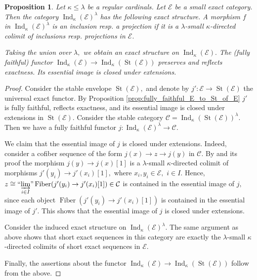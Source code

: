 \documentclass[11pt,leqno]{amsart}
\newtheorem{prop}[theo]{Proposition}
\numberwithin{equation}{section}
\newcommand{\indlim}[1][]{\mathop{\varinjlim}\limits_{#1}}
\newcommand{\inddlim}[1][]{{``{\indlim[#1]}"}}
\newcommand{\Fiber}{\operatorname{Fiber}}
\newcommand{\St}{\operatorname{St}}
\newcommand{\cC}{{\mathcal C}}
\newcommand{\cE}{{\mathcal E}}
\newcommand{\Ind}{\operatorname{Ind}}
\begin{document}
\begin{prop}\label{prop:exact_structure_on_Ind_kappa} Let $\kappa\leq \lambda$ be a regular cardinals. Let $\cE$ be a small exact category. Then the category $\Ind_{\kappa}(\cE)^{\lambda}$ has the following exact structure. A morphism $f$ in  $\Ind_{\kappa}(\cE)^{\lambda}$ is an inclusion resp. a projection if it is a $\lambda$-small $\kappa$-directed colimit of inclusions resp. projections in $\cE.$ 

Taking the union over $\lambda,$ we obtain an exact structure on $\Ind_{\kappa}(\cE).$ The (fully faithful) functor $\Ind_{\kappa}(\cE)\to \Ind_{\kappa}(\St(\cE))$ preserves and reflects exactness. Its  essential image is closed under extensions.
\end{prop}


\begin{proof} 
Consider the stable envelope $\St(\cE),$ and denote by $j':\cE\to\St(\cE)$ the universal exact functor. By Proposition \ref{prop:fully_faithful_E_to_St_of_E} $j'$ is fully faithful, reflects exactness, and its essential image is closed under extensions in $\St(\cE).$ Consider the stable category $\cC=\Ind_{\kappa}(\St(\cE))^{\lambda}.$ Then we have a fully faithful functor $j:\Ind_{\kappa}(\cE)^{\lambda}\to\cC.$ 

We claim that the essential image of $j$ is closed under extensions. Indeed, consider a cofiber sequence of the form $j(x)\to z\to j(y)$ in $\cC.$ By \cite[Proposition 5.3.5.15]{Lur09} and its proof the morphism $j(y)\to j(x)[1]$ is a $\lambda$-small $\kappa$-directed colimit of morphisms $j'(y_i)\to j'(x_i)[1],$ where $x_i,y_i\in \cE,$ $i\in I.$ Hence, $z\cong\inddlim[i\in I]\Fiber(j'(y_i)\to j'(x_i)[1])\in\cC$ is contained in the essential image of $j,$ since each object $\Fiber(j'(y_i)\to j'(x_i)[1])$ is contained in the essential image of $j'.$ This shows that the essential image of $j$ is closed under extensions.

Consider the induced exact structure on $\Ind_{\kappa}(\cE)^{\lambda}.$ The same argument as above shows that short exact sequences in this category are exactly the $\lambda$-small $\kappa$-directed colimits of short exact sequences in $\cE.$

Finally, the assertions about the functor $\Ind_{\kappa}(\cE)\to \Ind_{\kappa}(\St(\cE))$ follow from the above.
\end{proof}
\end{document}
